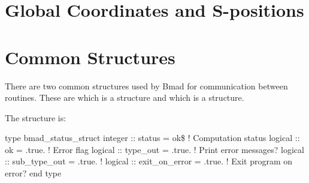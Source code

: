 \section{Global Coordinates and S-positions}
\label{s:global.coords}


\section{Common Structures}
\label{s:common.struct}


There are two common structures used by Bmad for communication between
routines. These are  which is a 
structure and  which is a 
structure.


The  structure is:
\begin{example}
type bmad_status_struct
  integer :: status         = ok\$     ! Computation status 
  logical :: ok             = .true.   ! Error flag
  logical :: type_out       = .true.   ! Print error messages?
  logical :: sub_type_out   = .true.   ! 
  logical :: exit_on_error  = .true.   ! Exit program on error?
end type
\end{example}




